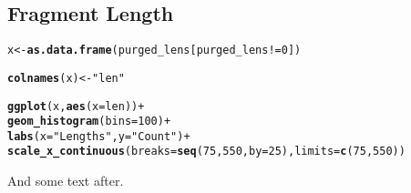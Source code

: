 \documentclass[12pt, a4paper]{article}\usepackage[]{graphicx}\usepackage[]{color}
\makeatletter
\newcommand{\hlnum}[1]{\textcolor[rgb]{0.686,0.059,0.569}{#1}}%
\newcommand{\hlstr}[1]{\textcolor[rgb]{0.192,0.494,0.8}{#1}}%
\newcommand{\hlopt}[1]{\textcolor[rgb]{0,0,0}{#1}}%
\newcommand{\hlstd}[1]{\textcolor[rgb]{0.345,0.345,0.345}{#1}}%
\newcommand{\hlkwb}[1]{\textcolor[rgb]{0.69,0.353,0.396}{#1}}%
\newcommand{\hlkwc}[1]{\textcolor[rgb]{0.333,0.667,0.333}{#1}}%
\newcommand{\hlkwd}[1]{\textcolor[rgb]{0.737,0.353,0.396}{\textbf{#1}}}%
\newenvironment{kframe}{%
 \def\at@end@of@kframe{}%
 \ifinner\ifhmode%
  \def\at@end@of@kframe{\end{minipage}}%
  \begin{minipage}{\columnwidth}%
 \fi\fi%
 \def\FrameCommand##1{\hskip\@totalleftmargin \hskip-\fboxsep
 \colorbox{shadecolor}{##1}\hskip-\fboxsep
     \hskip-\linewidth \hskip-\@totalleftmargin \hskip\columnwidth}%
 \MakeFramed {\advance\hsize-\width
   \@totalleftmargin\z@ \linewidth\hsize
   \@setminipage}}%
 {\par\unskip\endMakeFramed%
 \at@end@of@kframe}
\newenvironment{knitrout}{}{} %
\makeatother
\begin{document}
\subsection{Fragment Length}
\begin{knitrout}
\color{fgcolor}\begin{kframe}
\begin{alltt}
\hlstd{x} \hlkwb{<-} \hlkwd{as.data.frame}\hlstd{(purged_lens[purged_lens} \hlopt{!=} \hlnum{0}\hlstd{])}
\end{alltt}


{\ttfamily\noindent\bfseries\color{errorcolor}{\#\# Error in as.data.frame(purged\_lens[purged\_lens != 0]): object 'purged\_lens' not found}}\begin{alltt}
\hlkwd{colnames}\hlstd{(x)} \hlkwb{<-} \hlstr{"len"}
\end{alltt}


{\ttfamily\noindent\bfseries{}}\begin{alltt}
\hlkwd{ggplot}\hlstd{(x,} \hlkwd{aes}\hlstd{(}\hlkwc{x} \hlstd{= len))} \hlopt{+}
        \hlkwd{geom_histogram}\hlstd{(}\hlkwc{bins} \hlstd{=} \hlnum{100}\hlstd{)} \hlopt{+}
        \hlkwd{labs}\hlstd{(}\hlkwc{x} \hlstd{=} \hlstr{"Lengths"}\hlstd{,} \hlkwc{y} \hlstd{=} \hlstr{"Count"}\hlstd{)} \hlopt{+}
        \hlkwd{scale_x_continuous}\hlstd{(}\hlkwc{breaks} \hlstd{=} \hlkwd{seq}\hlstd{(}\hlnum{75}\hlstd{,} \hlnum{550}\hlstd{,} \hlkwc{by} \hlstd{=} \hlnum{25}\hlstd{),} \hlkwc{limits} \hlstd{=} \hlkwd{c}\hlstd{(}\hlnum{75}\hlstd{,}\hlnum{550}\hlstd{))}
\end{alltt}


{\ttfamily\noindent\bfseries\color{errorcolor}{\#\# Error in ggplot(x, aes(x = len)): object 'x' not found}}\end{kframe}
\end{knitrout}


And some text after.
\end{document}
